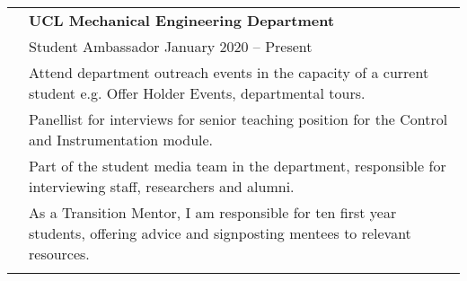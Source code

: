 \documentclass[letterpaper, 11pt]{article}
\begin{document}
\begin{longtable}{p{1.3in}p{4.8in}}
    {\color{OliveGreen}{Other experience}}
     & {\textbf{UCL Mechanical Engineering Department}}                                                                                                                                                                   \\
     & Student Ambassador \hfill January 2020 -- Present                                                                                                                                                                  \\
     & Attend department outreach events in the capacity of a current student e.g. Offer Holder Events, departmental tours.                                                                                               \\
     & Panellist for interviews for senior teaching position for the Control and Instrumentation module.                                                                                                                  \\
     & Part of the student media team in the department, responsible for interviewing staff, researchers and alumni.                                                                                                      \\
     & As a Transition Mentor, I am responsible for ten first year students, offering advice and signposting mentees to relevant resources.                                                                               \\
     &                                                                                                                                                                                                                    \\





\end{longtable}
\end{document}
